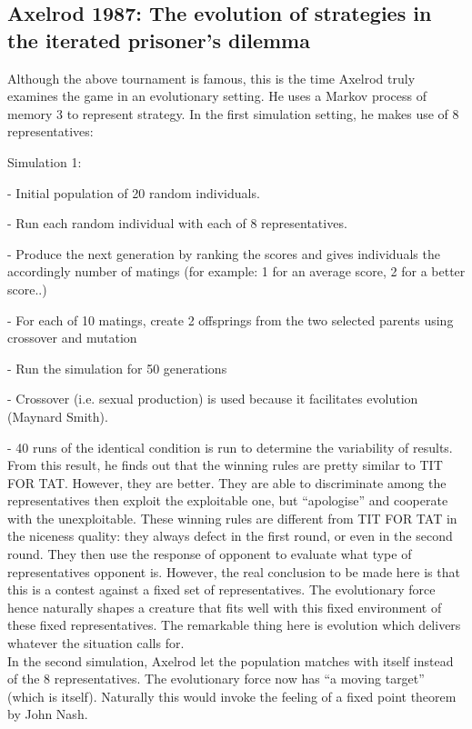 \documentclass[12.5pt]{report}
\begin{document}
\subsection{Axelrod 1987: The evolution of strategies in the iterated prisoner’s dilemma}

Although the above tournament is famous, this is the time Axelrod truly examines the game in an evolutionary setting. He uses a Markov process of memory 3 to represent strategy. In the first simulation setting, he makes use of 8 representatives:

Simulation 1:

- Initial population of 20 random individuals.

- Run each random individual with each of 8 representatives.

- Produce the next generation by ranking the scores and gives individuals the accordingly number of matings (for example: 1 for an average score, 2 for a better score..)

- For each of 10 matings, create 2 offsprings from the two selected parents using crossover and mutation

- Run the simulation for 50 generations

- Crossover (i.e. sexual production) is used because it facilitates evolution (Maynard Smith).

- 40 runs of the identical condition is run to determine the variability of results.\\

From this result, he finds out that the winning rules are pretty similar to TIT FOR TAT. However, they are better. They are able to discriminate among the representatives then exploit the exploitable one, but “apologise” and cooperate with the unexploitable. These winning rules are different from TIT FOR TAT in the niceness quality: they always defect in the first round, or even in the second round. They then use the response of opponent to evaluate what type of representatives opponent is.
However, the real conclusion to be made here is that this is a contest against a fixed set of representatives. The evolutionary force hence naturally shapes a creature that fits well with this fixed environment of these fixed representatives. The remarkable thing here is evolution which delivers whatever the situation calls for.\\

In the second simulation, Axelrod let the population matches with itself instead of the 8 representatives. The evolutionary force now has “a moving target” (which is itself). Naturally this would invoke the feeling of a fixed point theorem by John Nash.\\
\end{document}
